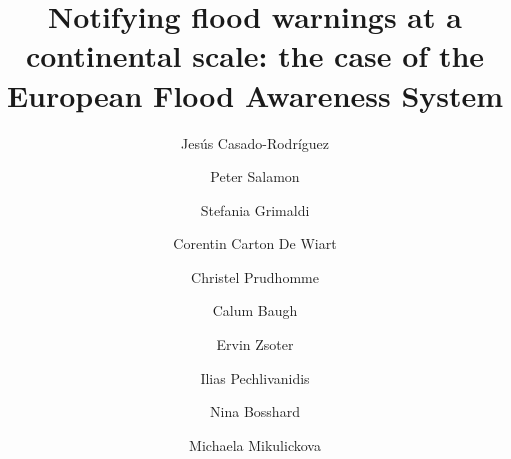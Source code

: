 \documentclass[preprint,12pt]{elsarticle}
\begin{document}
\begin{frontmatter}



\title{Notifying flood warnings at a continental scale: the case of the European Flood Awareness System}


\author[inst1]{Jesús Casado-Rodríguez}
\author[inst1]{Peter Salamon}
\author[inst2]{Stefania Grimaldi}
\author[inst2]{Corentin Carton De Wiart}
\author[inst2]{Christel Prudhomme}
\author[inst2]{Calum Baugh}
\author[inst2]{Ervin Zsoter}
\author[inst3]{Ilias Pechlivanidis}
\author[inst3]{Nina Bosshard}
\author[inst4]{Michaela Mikulickova}




\end{frontmatter}
\end{document}
